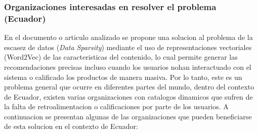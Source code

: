 \documentclass[12pt]{article}
\begin{document}
\subsubsection{Organizaciones interesadas en resolver el problema (Ecuador)}
En el documento o articulo analizado se propone una solucion al problema de la escasez de datos (\textit{Data Sparsity}) mediante el uso de representaciones vectoriales (Word2Vec) de las caracteristicas del contenido, lo cual permite generar las recomendaciones precisas incluso cuando los usuarios nohan interactuado con el sistema o calificado los productos de manera masiva. Por lo tanto, este es un problema general que ocurre en diferentes partes del mundo, dentro del contexto de Ecuador, existen varias organizaciones con catalogos dinamicos que sufren de la falta de retroalimentacion o calificaciones por parte de los usuarios. A continuacion se presentan algunas de las organizaciones que pueden beneficiarse de esta solucion en el contexto de Ecuador:
\end{document}
